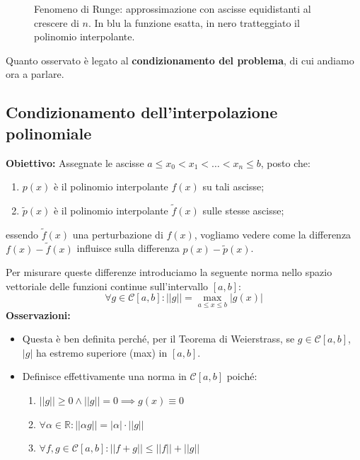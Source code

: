 \begin{figure}[htbp]
    \caption{Fenomeno di Runge: approssimazione con ascisse equidistanti al crescere di $n$. In blu la funzione esatta, in nero tratteggiato il polinomio interpolante.}
\end{figure}


Quanto osservato è legato al \textbf{condizionamento del problema}, di cui andiamo ora a parlare.
\subsection{Condizionamento dell'interpolazione polinomiale}
\textbf{Obiettivo:} Assegnate le ascisse $a \le x_0 < x_1 < \dots < x_n \le b$, posto che:
\begin{enumerate}
    \item $p(x)$ è il polinomio interpolante $f(x)$ su tali ascisse;
    \item $\tilde{p}(x)$ è il polinomio interpolante $\tilde{f}(x)$ sulle stesse ascisse;
\end{enumerate}
essendo $\tilde{f}(x)$ una perturbazione di $f(x)$, vogliamo vedere come la differenza $f(x) - \tilde{f}(x)$ influisce sulla differenza $p(x) - \tilde{p}(x)$.

Per misurare queste differenze introduciamo la seguente norma nello spazio vettoriale delle funzioni continue sull'intervallo $[a,b]$:
\begin{equation} \label{eq:norma_funzioni}
    \forall g \in \mathcal{C}[a,b] : ||g|| = \max_{a \le x \le b} |g(x)|
    \end{equation}
    \textbf{Osservazioni:}
    \begin{itemize}
        \item Questa è ben definita perché, per il Teorema di Weierstrass, se $g \in \mathcal{C}[a,b]$, $|g|$ ha estremo superiore (max) in $[a,b]$.
        \item Definisce effettivamente una norma in $\mathcal{C}[a,b]$ poiché:
        \begin{enumerate}
            \item $||g|| \ge 0 \land ||g|| = 0 \implies g(x) \equiv 0$
            \item $\forall \alpha \in \mathbb{R} : ||\alpha g|| = |\alpha| \cdot ||g||$
            \item $\forall f,g \in \mathcal{C}[a,b] : ||f+g|| \le ||f|| + ||g||$
        \end{enumerate}
    \end{itemize}

